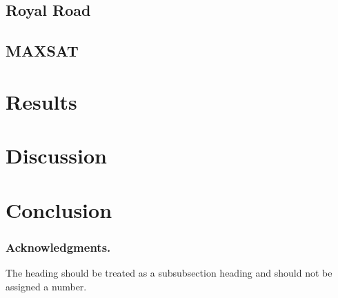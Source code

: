 \documentclass[runningheads,a4paper]{llncs}
\begin{document}
\subsection{Royal Road}

\subsection{MAXSAT}

\section{Results}

\section{Discussion}

\section{Conclusion}

\subsubsection*{Acknowledgments.} The heading should be treated as a
subsubsection heading and should not be assigned a number.



\end{document}
